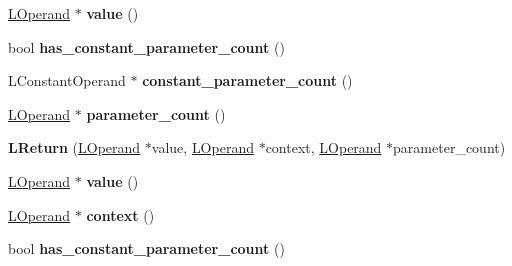\begin{DoxyCompactItemize}
\item 
\hyperlink{classv8_1_1internal_1_1_l_operand}{L\+Operand} $\ast$ {\bfseries value} ()\hypertarget{classv8_1_1internal_1_1_l_return_a846c6b559bdc3e68ab7de2472718eff0}{}\label{classv8_1_1internal_1_1_l_return_a846c6b559bdc3e68ab7de2472718eff0}

\item 
bool {\bfseries has\+\_\+constant\+\_\+parameter\+\_\+count} ()\hypertarget{classv8_1_1internal_1_1_l_return_a263e1bd29a12702e4c5fc6214fbe4ca5}{}\label{classv8_1_1internal_1_1_l_return_a263e1bd29a12702e4c5fc6214fbe4ca5}

\item 
L\+Constant\+Operand $\ast$ {\bfseries constant\+\_\+parameter\+\_\+count} ()\hypertarget{classv8_1_1internal_1_1_l_return_a0453fde1ccafc982160182465d2f2e4a}{}\label{classv8_1_1internal_1_1_l_return_a0453fde1ccafc982160182465d2f2e4a}

\item 
\hyperlink{classv8_1_1internal_1_1_l_operand}{L\+Operand} $\ast$ {\bfseries parameter\+\_\+count} ()\hypertarget{classv8_1_1internal_1_1_l_return_ad644e156a714136b62e763b8239f04fc}{}\label{classv8_1_1internal_1_1_l_return_ad644e156a714136b62e763b8239f04fc}

\item 
{\bfseries L\+Return} (\hyperlink{classv8_1_1internal_1_1_l_operand}{L\+Operand} $\ast$value, \hyperlink{classv8_1_1internal_1_1_l_operand}{L\+Operand} $\ast$context, \hyperlink{classv8_1_1internal_1_1_l_operand}{L\+Operand} $\ast$parameter\+\_\+count)\hypertarget{classv8_1_1internal_1_1_l_return_af69be24dc79385d85a6b221138258d67}{}\label{classv8_1_1internal_1_1_l_return_af69be24dc79385d85a6b221138258d67}

\item 
\hyperlink{classv8_1_1internal_1_1_l_operand}{L\+Operand} $\ast$ {\bfseries value} ()\hypertarget{classv8_1_1internal_1_1_l_return_a846c6b559bdc3e68ab7de2472718eff0}{}\label{classv8_1_1internal_1_1_l_return_a846c6b559bdc3e68ab7de2472718eff0}

\item 
\hyperlink{classv8_1_1internal_1_1_l_operand}{L\+Operand} $\ast$ {\bfseries context} ()\hypertarget{classv8_1_1internal_1_1_l_return_a0eee387275e5194dd983b56c9b8111c7}{}\label{classv8_1_1internal_1_1_l_return_a0eee387275e5194dd983b56c9b8111c7}

\item 
bool {\bfseries has\+\_\+constant\+\_\+parameter\+\_\+count} ()\hypertarget{classv8_1_1internal_1_1_l_return_a263e1bd29a12702e4c5fc6214fbe4ca5}{}\label{classv8_1_1internal_1_1_l_return_a263e1bd29a12702e4c5fc6214fbe4ca5}


\end{DoxyCompactItemize}
